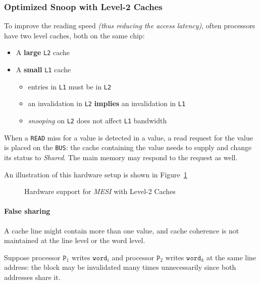 \documentclass[english]{article}
\begin{document}
\subsubsection{Optimized Snoop with Level-2 Caches}

To improve the reading speed \textit{(thus reducing the access latency)}, often processors have two level caches, both on the same chip:

\begin{itemize}
  \item A \textbf{large} \texttt{L2} cache
  \item A \textbf{small} \texttt{L1} cache
        \begin{itemize}
          \item entries in \texttt{L1} must be in \texttt{L2}
          \item an invalidation in \texttt{L2} \textbf{implies} an invalidation in \texttt{L1}
          \item \textit{snooping} on \texttt{L2} does not affect \texttt{L1} bandwidth
        \end{itemize}
\end{itemize}

When a \texttt{READ} miss for a value is detected in a value, a read request for the value is placed on the \texttt{BUS}:
the cache containing the value needs to supply and change its status to \textit{Shared}.
The main memory may respond to the request as well.

\bigskip
An illustration of this hardware setup is shown in Figure~\ref{fig:MESI-bus-rd-level-2}

\begin{figure}[htbp]
  \centering
  \bigskip
  \caption{Hardware support for \textit{MESI} with Level-2 Caches}
  \label{fig:MESI-bus-rd-level-2}
  \bigskip
\end{figure}

\paragraph{False sharing}

A cache line might contain more than one value, and cache coherence is not maintained at the line level or the word level.

Suppose processor \(\texttt{P}_1\) writes \(\texttt{word}_i\) and processor \(\texttt{P}_2\) writes \(\texttt{word}_k\) at the same line address:
the block may be invalidated many times unnecessarily since both addresses share it.
\end{document}
